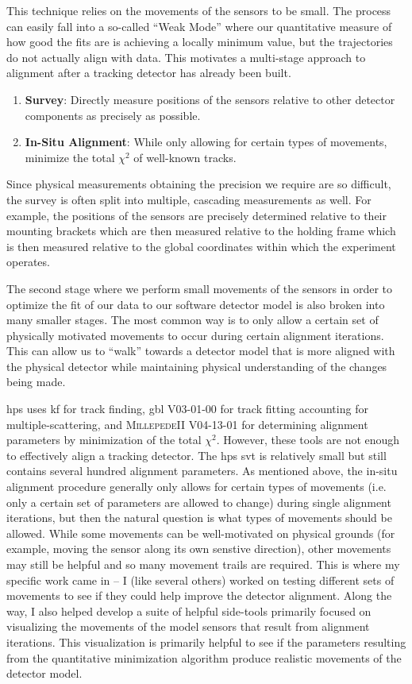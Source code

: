 This technique relies on the movements of the sensors to be small.
The process can easily fall into a so-called ``Weak Mode'' where our quantitative measure of
how good the fits are is achieving a locally minimum value, but the trajectories do not actually
align with data.
This motivates a multi-stage approach to alignment after a tracking detector has already been built.

\begin{enumerate}
  \item \textbf{Survey}: Directly measure positions of the sensors relative to other
        detector components as precisely as possible.
  \item \textbf{In-Situ Alignment}: While only allowing for certain types of movements,
        minimize the total $\chi^2$ of well-known tracks.
\end{enumerate}

Since physical measurements obtaining the precision we require are so difficult, the survey is
often split into multiple, cascading measurements as well.
For example, the positions of the sensors are precisely determined relative to their mounting
brackets which are then measured relative to the holding frame which is then measured relative
to the global coordinates within which the experiment operates.

The second stage where we perform small movements of the sensors in order to optimize the fit of
our data to our software detector model is also broken into many smaller stages.
The most common way is to only allow a certain set of physically motivated movements to occur
during certain alignment iterations.
This can allow us to ``walk'' towards a detector model that is more aligned
with the physical detector while maintaining physical understanding of the changes being made.

\ac{hps} uses \ac{kf} for track finding,
\ac{gbl} \cite{gbl-2012} V03-01-00 for track fitting accounting for multiple-scattering,
and \textsc{MillepedeII} \cite{millepede-2011} V04-13-01 for determining alignment parameters
by minimization of the total $\chi^2$.
However, these tools are not enough to effectively align a tracking detector.
The \ac{hps} \ac{svt} is relatively small but still contains several hundred alignment parameters.
As mentioned above, the in-situ alignment procedure generally only allows for certain types
of movements (i.e. only a certain set of parameters are allowed to change) during single
alignment iterations, but then the natural question is what types of movements should be allowed.
While some movements can be well-motivated on physical grounds (for example, moving the sensor
along its own senstive direction), other movements may still be helpful and so many movement trails
are required.
This is where my specific work came in -- I (like several others) worked on testing different
sets of movements to see if they could help improve the detector alignment.
Along the way, I also helped develop a suite of helpful side-tools primarily focused
on visualizing the movements of the model sensors that result from alignment iterations.
This visualization is primarily helpful to see if the parameters resulting from the quantitative
minimization algorithm produce realistic movements of the detector model.

